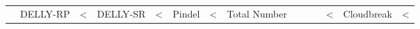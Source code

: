 \begin{table}
\begin{center}
\begin{tabular}{r|rrrr|rrrrr}
&  DELLY-RP & <%
&  DELLY-SR & <%
&  Pindel & <%
\hline
{} & Total Number & & & & <%
& Cloudbreak & <%

\end{tabular}
\end{center}
\end{table}

